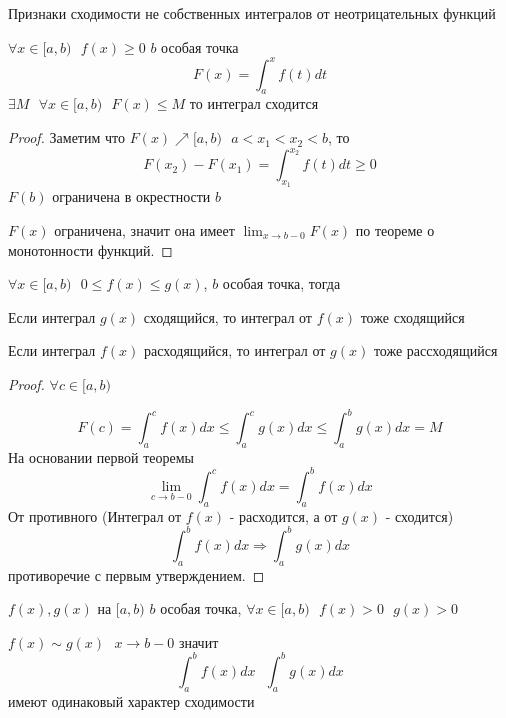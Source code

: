 \begin{title}[\Large]
  Признаки сходимости не собственных интегралов от неотрицательных функций
\end{title}

\begin{block}[Признак]
  $\forall x \in [a, b) ~~~ f(x) \ge 0$ $b$ особая точка
  \[
   F(x) = \int^{x}_{a} f(t)dt
  \]
  $\exists M ~~~ \forall x \in [a,b) ~~~ F(x) \le M$ то интеграл сходится
\end{block}

\begin{proof}
  Заметим что $F(x) \nearrow [a, b) ~~~ a < x_1 < x_2 < b$, то
  \[
    F(x_2) - F(x_1) = \int^{x_2}_{x_1} f(t)dt \ge 0
  \]
  $F(b)$ ограничена в окрестности $b$

  $F(x)$ ограничена, значит она имеет $\lim_{x \to b -0} F(x)$ по теореме о
  монотонности функций.
\end{proof}

\begin{block}
  $\forall x \in [a, b) ~~~ 0 \le f(x) \le g(x)$, $b$ особая точка,
  тогда

   Если интеграл $g(x)$ сходящийся, то интеграл от $f(x)$ тоже сходящийся

   Если интеграл $f(x)$ расходящийся, то интеграл от $g(x)$ тоже
  рассходящийся
\end{block}

\begin{proof}
  $\forall c \in [a, b)$

  \[
    F(c) = \int^{c}_{a} f(x)dx \le \int^{c}_{a} g(x)dx \le
    \int^{b}_{a} g(x)dx = M
  \]
  На основании первой теоремы
  \[
    \lim_{c \to b - 0} \int^{c}_{a} f(x)dx = \int^{b}_{a} f(x)dx
  \]
   От противного (Интеграл от $f(x)$ - расходится, а от $g(x)$ -
  сходится)
  \[
    \int^{b}_{a} f(x)dx \Rightarrow \int^{b}_{a} g(x)dx
  \]
  противоречие с первым утверждением.
\end{proof}

\begin{block}
  $f(x), g(x)$ на $[a, b)$ $b$ особая точка, $\forall x \in [a,b) ~~~
  f(x) > 0 ~~~ g(x) > 0$

  $f(x) \sim g(x) ~~~ x \to b -0$ значит
  $$
  \int_a^b f(x)dx ~~~ \int_a^b g(x)dx
  $$
  имеют одинаковый характер сходимости
\end{block}

